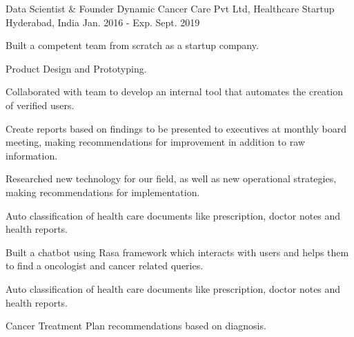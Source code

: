 


\begin{cventries}




\cventry
{Data Scientist \& Founder} %
{Dynamic Cancer Care Pvt Ltd, Healthcare Startup} %
{Hyderabad, India} %
{Jan. 2016 - Exp. Sept. 2019} %
{ %
\begin{cvitems}
\item {Built a competent team from scratch as a startup company.}
\item {Product Design and Prototyping.}
\item {Collaborated with team to develop an internal tool that automates the creation of verified users.}
\item {Create reports based on findings to be presented to executives at monthly board meeting, making recommendations for improvement in addition to raw information.}
\item {Researched new technology for our field, as well as new operational strategies, making recommendations for implementation.}
\item {Auto classification of health care documents like prescription, doctor notes and health reports.}
\item {Built a chatbot using Rasa framework which interacts with users and helps them to find a oncologist and cancer related queries.}
\item {Auto classification of health care documents like prescription, doctor notes and health reports.}
\item {Cancer Treatment Plan recommendations based on diagnosis.}
\end{cvitems}
}


\end{cventries}
